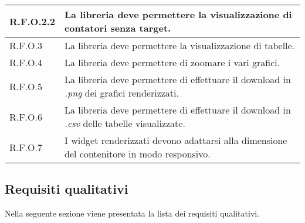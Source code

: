 \begin{center}
\begin{longtable}{|p{2.5cm}|p{10cm}|}
        \hline
        R.F.O.2.2          & La libreria deve permettere la visualizzazione di contatori senza target.                          \\
        \hline
        R.F.O.3            & La libreria deve permettere la visualizzazione di tabelle.                                         \\
        \hline
        R.F.O.4            & La libreria deve permettere di zoomare i vari grafici.                                             \\
        \hline
        R.F.O.5            & La libreria deve permettere di effettuare il download in \textit{.png} dei grafici renderizzati.   \\
        \hline
        R.F.O.6            & La libreria deve permettere di effettuare il download in \textit{.csv} delle tabelle visualizzate. \\
        \hline
        R.F.O.7            & I widget renderizzati devono adattarsi alla dimensione del contenitore in modo responsivo.         \\
    \end{longtable}
    \label{tab:requisiti_funzionali}
\end{center}

\subsection{Requisiti qualitativi}
Nella seguente sezione viene presentata la lista dei requisiti qualitativi.

